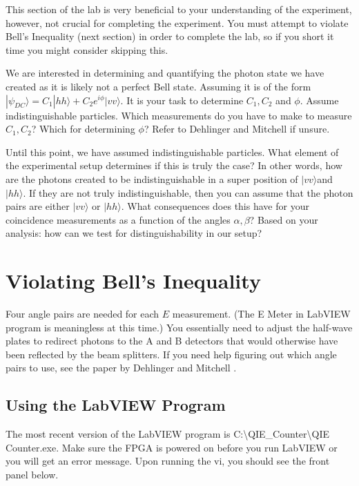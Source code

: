\documentclass{../lab}
\begin{document}
This section of the lab is very beneficial to your understanding of the experiment, however, not crucial for completing the experiment. You must attempt to violate Bell's Inequality (next section) in order to complete the lab, so if you short it time you might consider skipping this.

We are interested in determining and quantifying the photon state we have created as it is likely not a perfect Bell state. Assuming it is of the form $|\psi_{DC}\rangle = C_1 |hh\rangle + C_2 e^{i\phi}|vv\rangle$. It is your task to determine $C_1, C_2$ and $\phi$. Assume indistinguishable particles. Which measurements do you have to make to measure $C_1, C_2$? Which for determining $\phi$? Refer to Dehlinger and Mitchell \cite{Dehlinger} if unsure.

Until this point, we have assumed indistinguishable particles. What element of the experimental setup determines if this is truly the case? In other words, how are the photons created to be indistinguishable in a super position of $|vv\rangle$and $|hh\rangle$. If they are not truly indistinguishable, then you can assume that the photon pairs are either $|vv\rangle$ or $|hh\rangle$. What consequences does this have for your coincidence measurements as a function of the angles $\alpha, \beta$? Based on your analysis: how can we test for distinguishability in our setup?

\section{Violating Bell's Inequality}

Four angle pairs are needed for each $E$ measurement. (The E Meter in LabVIEW program is meaningless at this time.) You essentially need to adjust the half-wave plates to redirect photons to the A and B detectors that would otherwise have been reflected by the beam splitters. If you need help figuring out which angle pairs to use, see the paper by Dehlinger and Mitchell \cite{Dehlinger}.

\subsection{Using the LabVIEW Program}
\label{subsec:UsingLabVIEWProgram}

The most recent version of the LabVIEW program is C:\textbackslash QIE\_Counter\textbackslash QIE Counter.exe. Make sure the FPGA is powered on before you run LabVIEW or you will get an error message. Upon running the vi, you should see the front panel below.
\end{document}
